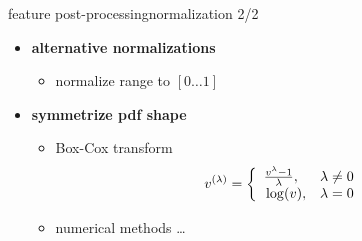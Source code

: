 		\begin{frame}{feature post-processing}{normalization 2/2}
			\begin{itemize}
                \item    \textbf{alternative normalizations}
                    \begin{itemize}
                        \item   normalize range to $[0\ldots 1]$
                    \end{itemize}
				\bigskip
                \item<2->	\textbf{symmetrize pdf shape} 
                    \begin{itemize}
                        \item Box-Cox transform
                            \begin{eqnarray*}
                                v^{(\lambda)} = \left\{ 
                                                \begin{array}{ll} 
                                                    \frac{v^\lambda - 1}{\lambda}, 		& \lambda \neq 0\\ 
                                                    \vphantom{\frac{1}{1}} 	\log(v), 	& \lambda = 0 \\ 
                                                \end{array} 
                                                \right. 
                            \end{eqnarray*}
                        \item   numerical methods \ldots
                    \end{itemize}
            \end{itemize}
             
		\end{frame}
        
